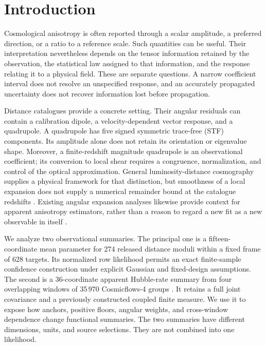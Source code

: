 \section{Introduction}
\label{sec:intro}

Cosmological anisotropy is often reported through a scalar amplitude, a preferred direction, or a ratio to a reference scale. Such quantities can be useful. Their interpretation nevertheless depends on the tensor information retained by the observation, the statistical law assigned to that information, and the response relating it to a physical field. These are separate questions. A narrow coefficient interval does not resolve an unspecified response, and an accurately propagated uncertainty does not recover information lost before propagation.

Distance catalogues provide a concrete setting. Their angular residuals can contain a calibration dipole, a velocity-dependent vector response, and a quadrupole. A quadrupole has five signed symmetric trace-free (STF) components. Its amplitude alone does not retain its orientation or eigenvalue shape. Moreover, a finite-redshift magnitude quadrupole is an observational coefficient; its conversion to local shear requires a congruence, normalization, and control of the optical approximation. General luminosity-distance cosmography supplies a physical framework for that distinction, but smoothness of a local expansion does not supply a numerical remainder bound at the catalogue redshifts \cite{Heinesen2021,Maartens2024}. Existing angular expansion analyses likewise provide context for apparent anisotropy estimators, rather than a reason to regard a new fit as a new observable in itself \cite{Kalbouneh2026}.

We analyze two observational summaries. The principal one is a fifteen-coordinate mean parameter for 274 released distance moduli within a fixed frame of 628 targets. Its normalized row likelihood permits an exact finite-sample confidence construction under explicit Gaussian and fixed-design assumptions. The second is a 36-coordinate apparent Hubble-rate summary from four overlapping windows of 35\,970 Cosmicflows-4 groups \cite{Tully2023}. It retains a full joint covariance and a previously constructed coupled finite measure. We use it to expose how anchors, positive floors, angular weights, and cross-window dependence change functional summaries. The two summaries have different dimensions, units, and source selections. They are not combined into one likelihood.

